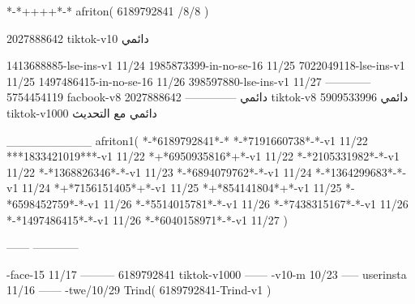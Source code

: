 *-*++++*-*
afriton(
6189792841 /8/8
)

2027888642 tiktok-v10
دائمي

1413688885-lse-ins-v1 11/24
1985873399-in-no-se-16 11/25
7022049118-lse-ins-v1 11/25
1497486415-in-no-se-16 11/26
398597880-lse-ins-v1 11/27
------------
5754454119 facbook-v8
دائمي
--------------
2027888642 tiktok-v8
دائمي
5909533996 tiktok-v1000
دائمي مع التحديث

__________
afriton1(
*-*6189792841*-*
*-*7191660738*-*-v1 11/22
***1833421019***-v1 11/22
*+*6950935816*+*-v1 11/22
*-*2105331982*-*-v1 11/22
*-*1368826346*-*-v1 11/23
*-*6894079762*-*-v1 11/24
*-*1364299683*-*-v1 11/24
*+*7156151405*+*-v1 11/25
*+*854141804*+*-v1 11/25
*-*6598452759*-*-v1 11/26
*-*5514015781*-*-v1 11/26
*-*7438315167*-*-v1 11/26
*-*1497486415*-*-v1 11/26
*-*6040158971*-*-v1 11/27
)

------
------------

-face-15 11/17
---------
6189792841 tiktok-v1000
------
-v10-m 10/23
-----
userinsta 11/16
------
-twe/10/29
Trind(
6189792841-Trind-v1 
)
